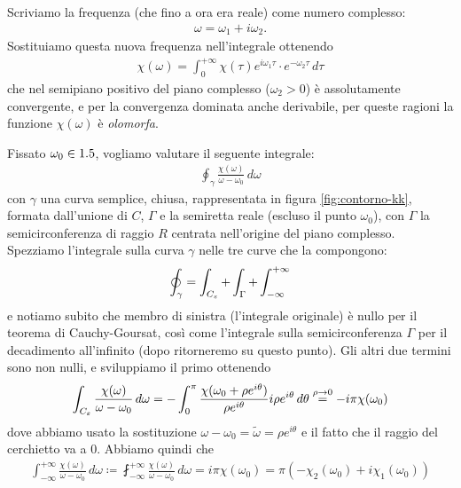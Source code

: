 Scriviamo la frequenza (che fino a ora era reale) come numero complesso:
\begin{align}
  \omega = \omega_1 + i \omega_2.
\end{align}
Sostituiamo questa nuova frequenza nell'integrale ottenendo 
\begin{align}
  \chi(\omega) = \int_{0}^{+\infty} \chi(\tau) e^{i\omega_1 \tau} \cdot e^{-\omega_2 \tau} \,d\tau
\end{align}
che nel semipiano positivo del piano complesso ($ \omega_2 > 0 $) è assolutamente convergente, e per la convergenza dominata anche derivabile, per queste 
ragioni la funzione $ \chi(\omega) $ è \textit{olomorfa}. 

Fissato $ \omega_0 \in 1.5 $, vogliamo valutare il seguente integrale:
\begin{align}
  \oint_\gamma \frac{\chi(\omega)}{\omega - \omega_0} \,d\omega
\end{align}
con $ \gamma $ una curva semplice, chiusa, rappresentata in figura \ref{fig:contorno-kk}, formata dall'unione di $ C $, $ \Gamma $ e la semiretta reale 
(escluso il punto $ \omega_0 $), con $ \Gamma $ la semicirconferenza di raggio $ R $ centrata nell'origine del piano complesso. 
Spezziamo l'integrale sulla curva $ \gamma $ nelle tre curve che la compongono:
\begin{align}
  \oint_\gamma  = \int_{C_\varepsilon} + \int_\Gamma + \int_{-\infty}^{+\infty} 
\end{align}
e notiamo subito che membro di sinistra (l'integrale originale) è nullo per il teorema di Cauchy-Goursat, così come l'integrale sulla semicirconferenza 
$ \Gamma $ per il decadimento all'infinito (dopo ritorneremo su questo punto). Gli altri due termini sono non nulli, e sviluppiamo il primo ottenendo
\begin{align}
  \int_{C_\varepsilon} \frac{\chi(\omega)}{\omega - \omega_0} \,d\omega 
  = - \int_0^\pi \frac{\chi(\omega_0 + \rho e^{i\theta})}{\rho e^{i\theta}} i \rho e^{i \theta} \,d\theta
  \overset{\rho \to 0}{=} - i \pi \chi(\omega_0) 
\end{align}
dove abbiamo usato la sostituzione $ \omega - \omega_0 = \tilde{\omega} = \rho e^{i \theta} $ e il fatto che il raggio del cerchietto va a $ 0 $. 
Abbiamo quindi che 
\begin{align}
  \int_{-\infty}^{+\infty} \frac{\chi(\omega)}{\omega - \omega_0} \,d\omega 
  \coloneq \fint_{-\infty}^{+\infty} \frac{\chi(\omega)}{\omega - \omega_0} \,d\omega 
  = i \pi \chi(\omega_0) = \pi \left( -\chi_2(\omega_0) + i \chi_1(\omega_0) \right)
\end{align}
